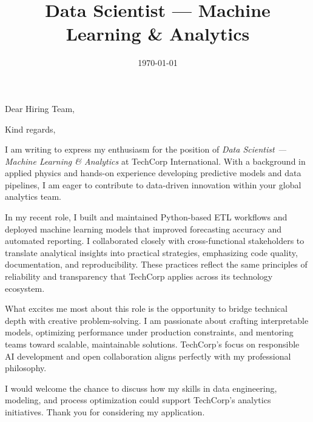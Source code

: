 \documentclass[11pt,a4paper,sans]{moderncv}
\title{Data Scientist — Machine Learning & Analytics}
\begin{document}
\date{\today}
\opening{Dear Hiring Team,}
\closing{Kind regards,}

\makelettertitle

I am writing to express my enthusiasm for the position of \textit{Data Scientist — Machine Learning \& Analytics} at TechCorp International. With a background in applied physics and hands-on experience developing predictive models and data pipelines, I am eager to contribute to data-driven innovation within your global analytics team.

In my recent role, I built and maintained Python-based ETL workflows and deployed machine learning models that improved forecasting accuracy and automated reporting. I collaborated closely with cross-functional stakeholders to translate analytical insights into practical strategies, emphasizing code quality, documentation, and reproducibility. These practices reflect the same principles of reliability and transparency that TechCorp applies across its technology ecosystem.

What excites me most about this role is the opportunity to bridge technical depth with creative problem-solving. I am passionate about crafting interpretable models, optimizing performance under production constraints, and mentoring teams toward scalable, maintainable solutions. TechCorp’s focus on responsible AI development and open collaboration aligns perfectly with my professional philosophy.

I would welcome the chance to discuss how my skills in data engineering, modeling, and process optimization could support TechCorp’s analytics initiatives. Thank you for considering my application.

\makeletterclosing
\end{document}
